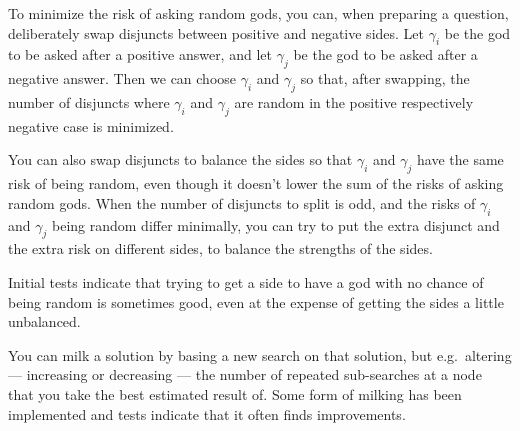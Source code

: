 \documentclass[twoside,twocolumn,a4paper,11pt]{article}
\theoremstyle{definition}
\begin{document}
To minimize the risk of asking random gods, you can,
when preparing a question, 
deliberately swap disjuncts between positive and
negative sides. 
Let $\gamma_i$ be the god to be asked after a positive answer, and 
let $\gamma_j$ be the god to be asked after a negative answer.
Then we can choose $\gamma_i$ and $\gamma_j$ so that, after swapping, 
the number of disjuncts where $\gamma_i$ and $\gamma_j$ are random in the
positive respectively 
negative case is minimized.

You can also swap disjuncts to balance the sides so that
$\gamma_i$ and $\gamma_j$ have the same risk of being random,
even though it doesn't lower the sum of the risks of asking random gods.
When the number of disjuncts to split is odd, and the risks of $\gamma_i$ and $\gamma_j$
being random differ minimally,
you can try to put the extra disjunct and 
the extra risk
on different sides, to balance the strengths of the sides.

Initial 
tests 
indicate that trying to get a side to have a god with no chance of
being random is sometimes good, even at the expense of getting the sides a little unbalanced.

You can milk a solution by basing a new search on that solution, 
but e.g.\ altering --- increasing or decreasing --- the number of  
repeated sub-searches at a node that you take the best estimated
result of.
Some form of milking has been implemented and tests indicate that
it often finds 
improvements.


\end{document}
